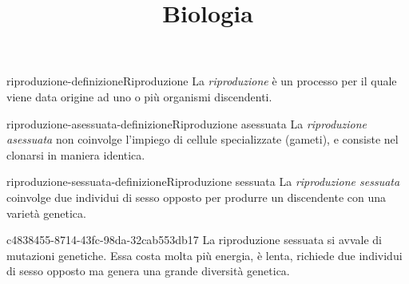 \documentclass[preview]{standalone}
\begin{document}
\title{Biologia}
\genpage

\begin{snippetdefinition}{riproduzione-definizione}{Riproduzione}
    La \textit{riproduzione} è un processo per il quale viene data origine ad uno o più organismi
    discendenti.
\end{snippetdefinition}

\begin{snippetdefinition}{riproduzione-asessuata-definizione}{Riproduzione asessuata}
    La \textit{riproduzione asessuata} non coinvolge l'impiego di cellule specializzate (gameti),
    e consiste nel clonarsi in maniera identica.
\end{snippetdefinition}


\begin{snippetdefinition}{riproduzione-sessuata-definizione}{Riproduzione sessuata}
    La \textit{riproduzione sessuata} coinvolge due individui di sesso opposto per produrre un discendente
    con una varietà genetica.
\end{snippetdefinition}

\begin{snippet}{c4838455-8714-43fc-98da-32cab553db17}
    La riproduzione sessuata si avvale di mutazioni genetiche.
    Essa costa molta più energia, è lenta, richiede due individui di sesso opposto ma
    genera una grande diversità genetica.
\end{snippet}
\end{document}
